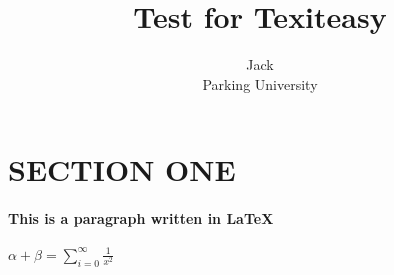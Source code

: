 \documentclass{article}
\author{Jack \\
        Parking University }
\title{Test for Texiteasy}
\date{}
\begin{document}
\maketitle
    \section*{SECTION ONE}
    \paragraph{This is a paragraph written in \LaTeX}    
    $\alpha + \beta = \sum_{i=0}^{\infty}\frac{1}{x^2}$
\end{document}
